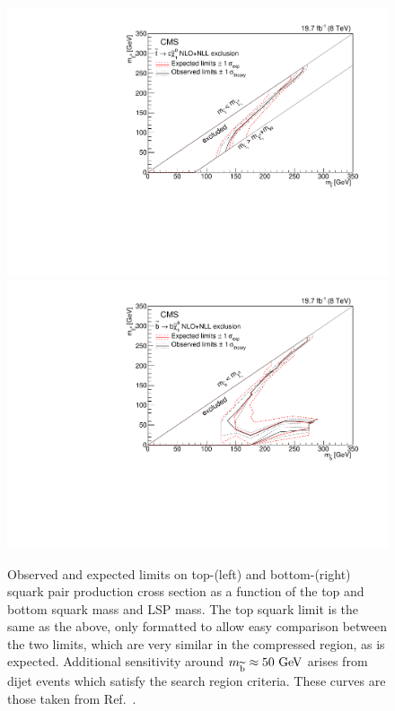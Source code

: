 \begin{figure}[!Hhtb]
  \begin{center}
  \includegraphics[scale=0.39]{Figures/sus13009/limitplots/plots/stop/mstop_lsp.pdf}
  \includegraphics[scale=0.39]{Figures/sus13009/limitplots/plots/sbottom/msbottom_lsp.pdf}
  \caption{ Observed and expected limits on top-(left) and bottom-(right) squark pair production cross section as a function of the top and bottom squark mass and LSP mass. The top squark limit is the same as the above, only formatted to allow easy comparison between the two limits, which are very similar in the compressed region, as is expected. Additional sensitivity around $m_{\widetilde{{\rm b}}}\approx50~\mathrm{GeV}$ arises from dijet events which satisfy the search region criteria.
  These curves are those taken from Ref.~\cite{sus14001}.}
  \label{fig:sbottom_limits_2D}
  \end{center}
\end{figure}

